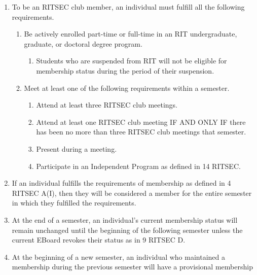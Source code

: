 


\begin{enumerate}
  \item To be an RITSEC club member, an individual must fulfill all the
    following requirements.
  \begin{enumerate}
    \item Be actively enrolled part-time or full-time in an RIT undergraduate,
      graduate, or doctoral degree program.
    \begin{enumerate}
      \item Students who are suspended from RIT will not be eligible for
        membership status during the period of their suspension.
    \end{enumerate}
    \item Meet at least one of the following requirements within a semester.
    \begin{enumerate}
      \item Attend at least three RITSEC club meetings.
      \item Attend at least one RITSEC club meeting IF AND ONLY IF there has
        been no more than three RITSEC club meetings that semester.
      \item Present during a meeting.
      \item Participate in an Independent Program as defined in 14 RITSEC.
    \end{enumerate}
  \end{enumerate}
  \item If an individual fulfills the requirements of membership as defined in
    4 RITSEC A(I), then they will be considered a member for the entire
    semester in which they fulfilled the requirements.
  \item At the end of a semester, an individual's current membership status
    will remain unchanged until the beginning of the following semester unless
    the current EBoard revokes their status as in 9 RITSEC D.
  \item At the beginning of a new semester, an individual who maintained a
    membership during the previous semester will have a provisional membership

\end{enumerate}
